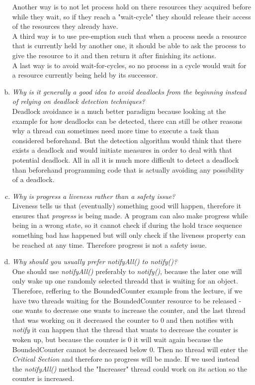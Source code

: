 \documentclass{report}
\begin{document}
\begin{enumerate}[a)]
			Another way is to not let process hold on there resources they acquired before while they wait, so if they reach a "wait-cycle" they should release their access of the resources they already have. \\
			A third way is to use pre-emption such that when a process needs a resource that is currently held by another one, it should be able to ask the process to give the resource to it and then return it after finishing its actions. \\
			A last way is to avoid wait-for-cycles, so no process in a cycle would wait for a resource currently being held by its successor.
			\item \textit{Why is it generally a good idea to avoid deadlocks from the beginning instead of relying on deadlock detection techniques?} \\
			Deadlock avoidance is a much better paradigm because looking at the example for how deadlocks can be detected, there can still be other reasons why a thread can sometimes need more time to execute a task than considered beforehand. But the detection algorithm would think that there exists a deadlock and would initiate measures in order to deal with that potential deadlock. All in all it is much more difficult to detect a deadlock than beforehand programming code that is actually avoiding any possibility of a deadlock.
			\item \textit{Why is progress a liveness rather than a safety issue?} \\
			Liveness tells us that (eventually) something good will happen, therefore it ensures that \textit{progress} is being made. A program can also make progress while being in a wrong state, so it cannot check if during the hold trace sequence something bad has happened but will only check if the liveness property can be reached at any time. Therefore progress is not a safety issue.
			\item \textit{Why should you usually prefer notifyAll() to notify()?} \\
			One should use \textit{notifyAll()} preferably to \textit{notify()}, because the later one will only wake up one randomly selected threadd that is waiting for an object. Therefore, reffering to the BoundedCounter example from the lecture, if we have two threads waiting for the BoundedCounter resource to be released - one wants to decrease one wants to increase the counter, and the last thread that was working on it decreased the counter to 0 and then notifies with \textit{notify} it can happen that the thread that wants to decrease the counter is woken up, but because the counter is 0 it will wait again because the BoundedCounter cannot be decreased below 0. Then no thread will enter the \textit{Critical Section} and therefore no progress will be made. If we used instead the \textit{notifyAll()} method the "Increaser" thread could work on its action so the counter is increased.

\end{enumerate}
\end{document}
